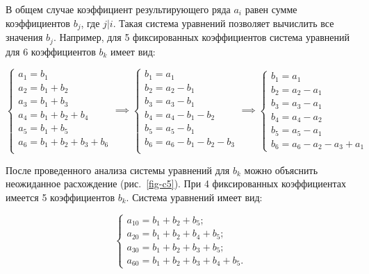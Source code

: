 \documentclass[intlimits,twoside,a4paper,11pt]{article}
\begin{document}
    В общем случае коэффициент результирующего ряда $a_i$ равен сумме коэффициентов $b_j$, где $j | i$.  
    Такая система уравнений позволяет вычислить все значения $b_j$. Например, для 5 фиксированных коэффициентов 
    система уравнений для 6 коэффициентов $b_k$ имеет вид:

    \begin{equation*}
        \begin{cases}
            a_1 = b_1  \\
            a_2 = b_1 + b_2 \\
            a_3 = b_1 + b_3 \\
            a_4 = b_1 + b_2 + b_4 \\
            a_5 = b_1 + b_5 \\
            a_6 = b_1 + b_2 + b_3 + b_6 \\
        \end{cases}
    \implies
    \begin{cases}
            b_1 = a_1 \\
            b_2 = a_2 - b_1 \\
            b_3 = a_3 - b_1 \\
            b_4 = a_4 - b_1 - b_2 \\
            b_5 = a_5 - b_1 \\
            b_6 = a_6 - b_1 - b_2 - b_3 \\
        \end{cases}
    \implies
    \begin{cases}
            b_1 = a_1 \\
            b_2 = a_2 - a_1 \\
            b_3 = a_3 - a_1 \\
            b_4 = a_4 - a_2  \\
            b_5 = a_5 - a_1 \\
            b_6 = a_6 - a_2 - a_3 + a_1
        \end{cases}
    \end{equation*}

    После проведенного анализа системы уравнений для $b_k$ можно объяснить неожиданное расхождение (рис.~\ref{fig-c5}). 
    При 4 фиксированных коэффициентах имеется 5 коэффициентов $b_k$. Система уравнений имеет вид:

    \begin{equation}
        \begin{cases}
            a_{10} = b_1 + b_2 + b_5; \\
            a_{20} = b_1 + b_2 + b_4 + b_5; \\
            a_{30} = b_1 + b_2 + b_3 + b_5; \\
            a_{60} = b_1 + b_2 + b_3 + b_4 + b_5.
        \end{cases}
    \end{equation}
\end{document}

